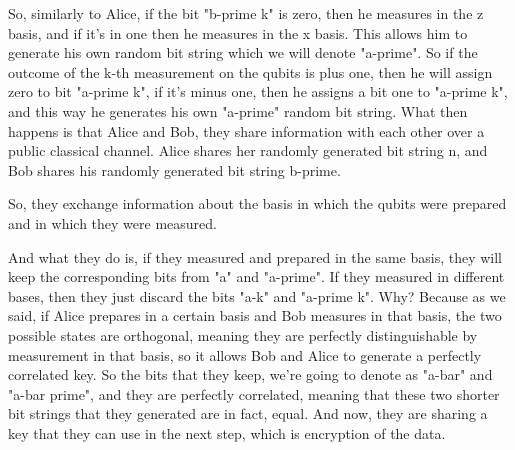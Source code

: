 So, similarly to Alice, if the bit "b-prime k" is zero, then he measures in the z basis, and if it's in one then he measures in the x basis. This allows him to generate his own random bit string which we will denote "a-prime". So if the outcome of the k-th measurement on the qubits is plus one, then he will assign zero to bit "a-prime k", if it's minus one, then he assigns a bit one to "a-prime k", and this way he generates his own "a-prime" random bit string. What then happens is that Alice and Bob, they share information with each other over a public classical channel. Alice shares her randomly generated bit string n, and Bob shares his randomly generated bit string b-prime.

So, they exchange information about the basis in which the qubits were prepared and in which they were measured.

And what they do is, if they measured and prepared in the same basis, they will keep the corresponding bits from "a" and "a-prime". If they measured in different bases, then they just discard the bits "a-k" and "a-prime k". Why? Because as we said, if Alice prepares in a certain basis and Bob measures in that basis, the two possible states are orthogonal, meaning they are perfectly distinguishable by measurement in that basis, so it allows Bob and Alice to generate a perfectly correlated key. So the bits that they keep, we're going to denote as "a-bar" and "a-bar prime", and they are perfectly correlated, meaning that these two shorter bit strings that they generated are in fact, equal. And now, they are sharing a key that they can use in the next step, which is encryption of the data.

